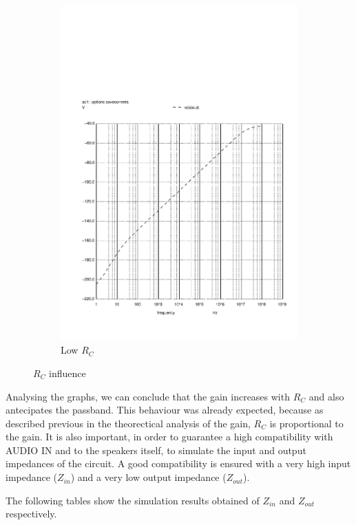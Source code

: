 \begin{figure}[H]
\begin{subfigure}{0.3\textwidth}
\includegraphics[width=\textwidth]{rclow.pdf}
\caption{Low $R_C$}
\label{lowrc}
\end{subfigure}
\caption{$R_C$ influence}
\end{figure}

Analysing the graphs, we can conclude that the gain increases with $R_C$ and also antecipates the passband.
This behaviour was already expected, because as described previous in the theorectical analysis of the gain, $R_C$ is proportional to the gain.
It is also important, in order to guarantee a high compatibility with AUDIO IN and to the speakers itself, to simulate the input and output impedances of the circuit. 
A good compatibility is ensured with a very high input impedance ($Z_{in}$) and a very low output impedance ($Z_{out}$). \par 
The following tables show the simulation results obtained of $Z_{in}$ and $Z_{out}$ respectively.

